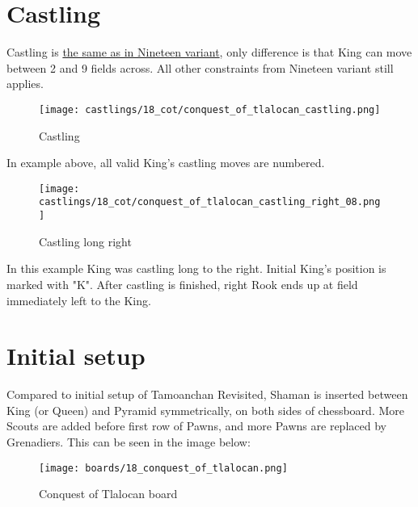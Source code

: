 \section*{Castling}
\label{sec:Conquest of Tlalocan/Castling}

Castling is
\hyperref[sec:Nineteen/Castling]{the same as in Nineteen variant},
only difference is that King can move
between 2 and 9 fields across. All other constraints from Nineteen variant still
applies.

\noindent
\begin{figure}[!h]
\texttt{[image: castlings/18\_cot/conquest\_of\_tlalocan\_castling.png]}
\caption{Castling}
\label{fig:conquest_of_tlalocan_castling}
\end{figure}

In example above, all valid King's castling moves are numbered.

\noindent
\begin{figure}[!h]
\texttt{[image: castlings/18\_cot/conquest\_of\_tlalocan\_castling\_right\_08.png]}
\caption{Castling long right}
\label{fig:conquest_of_tlalocan_castling_right_08}
\end{figure}

In this example King was castling long to the right. Initial King's position
is marked with "K". After castling is finished, right Rook ends up at field
immediately left to the King.

\clearpage %

\section*{Initial setup}
\label{sec:Conquest of Tlalocan/Initial setup}

Compared to initial setup of Tamoanchan Revisited, Shaman is inserted between
King (or Queen) and Pyramid symmetrically, on both sides of chessboard. More
Scouts are added before first row of Pawns, and more Pawns are replaced by
Grenadiers. This can be seen in the image below:

\noindent
\begin{figure}[h]
\texttt{[image: boards/18\_conquest\_of\_tlalocan.png]}
\caption{Conquest of Tlalocan board}
\label{fig:18_conquest_of_tlalocan}
\end{figure}

\clearpage %
